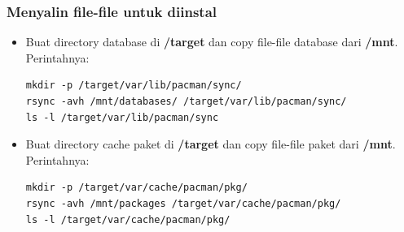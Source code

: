 \documentclass[12pt,]{article}
\begin{document}
	\subsubsection{Menyalin file-file untuk diinstal}
	\begin{itemize}
	\item Buat directory database di \textbf{/target} dan copy file-file database dari \textbf{/mnt}.
		Perintahnya:
		\begin{verbatim}
mkdir -p /target/var/lib/pacman/sync/
rsync -avh /mnt/databases/ /target/var/lib/pacman/sync/
ls -l /target/var/lib/pacman/sync
		\end{verbatim}

		\item Buat directory cache paket di \textbf{/target} dan copy file-file paket dari \textbf{/mnt}.
		Perintahnya:
		\begin{verbatim}
mkdir -p /target/var/cache/pacman/pkg/
rsync -avh /mnt/packages /target/var/cache/pacman/pkg/
ls -l /target/var/cache/pacman/pkg/
		\end{verbatim}
	\end{itemize}
\end{document}
